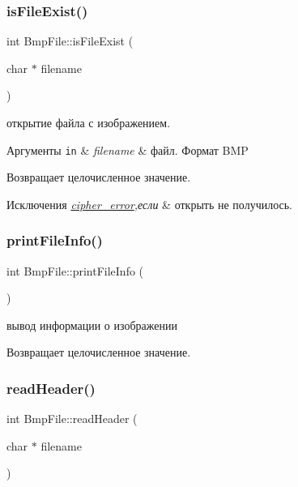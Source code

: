 \subsubsection{\texorpdfstring{is\+File\+Exist()}{isFileExist()}}
{\footnotesize\ttfamily int Bmp\+File\+::is\+File\+Exist (\begin{DoxyParamCaption}\item[{char $\ast$}]{filename }\end{DoxyParamCaption})}



открытие файла с изображением. 


\begin{DoxyParams}[1]{Аргументы}
\mbox{\tt in}  & {\em filename} & файл. Формат B\+MP \\
\hline
\end{DoxyParams}
\begin{DoxyReturn}{Возвращает}
целочисленное значение. 
\end{DoxyReturn}

\begin{DoxyExceptions}{Исключения}
{\em \hyperlink{classcipher__error}{cipher\+\_\+error},если} & открыть не получилось. \\
\hline
\end{DoxyExceptions}
\mbox{\label{classBmpFile_acd76df84283673fd0bfc32b8edb8239b}} 
\subsubsection{\texorpdfstring{print\+File\+Info()}{printFileInfo()}}
{\footnotesize\ttfamily int Bmp\+File\+::print\+File\+Info (\begin{DoxyParamCaption}{ }\end{DoxyParamCaption})}



вывод информации о изображении 

\begin{DoxyReturn}{Возвращает}
целочисленное значение. 
\end{DoxyReturn}
\mbox{\label{classBmpFile_aea6e2670a066a2967837c54323d7eaf0}} 
\subsubsection{\texorpdfstring{read\+Header()}{readHeader()}}
{\footnotesize\ttfamily int Bmp\+File\+::read\+Header (\begin{DoxyParamCaption}\item[{char $\ast$}]{filename }\end{DoxyParamCaption})}



